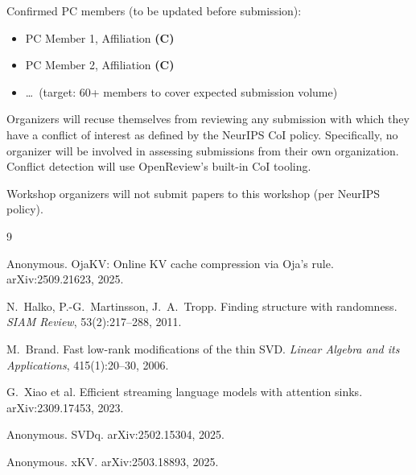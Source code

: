 \documentclass{article}
\begin{document}
Confirmed PC members (to be updated before submission):
\begin{itemize}[nosep,leftmargin=1.5em]
  \item PC Member 1, Affiliation \textbf{(C)}
  \item PC Member 2, Affiliation \textbf{(C)}
  \item \ldots\ (target: 60+ members to cover expected submission volume)
\end{itemize}

Organizers will recuse themselves from reviewing any submission with which they
have a conflict of interest as defined by the NeurIPS CoI policy.
Specifically, no organizer will be involved in assessing submissions from their
own organization.  Conflict detection will use OpenReview's built-in CoI tooling.

Workshop organizers will not submit papers to this workshop (per NeurIPS policy).


\begin{thebibliography}{9}

Anonymous.
OjaKV: Online KV cache compression via Oja's rule.
arXiv:2509.21623, 2025.

N.~Halko, P.-G.~Martinsson, J.~A.~Tropp.
Finding structure with randomness.
\emph{SIAM Review}, 53(2):217--288, 2011.

M.~Brand.
Fast low-rank modifications of the thin SVD.
\emph{Linear Algebra and its Applications}, 415(1):20--30, 2006.

G.~Xiao et al.
Efficient streaming language models with attention sinks.
arXiv:2309.17453, 2023.

Anonymous. SVDq. arXiv:2502.15304, 2025.

Anonymous. xKV. arXiv:2503.18893, 2025.

\end{thebibliography}
\end{document}
